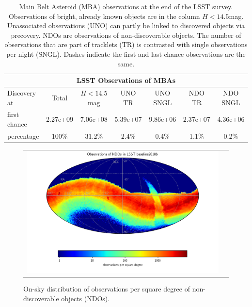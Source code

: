 \begin{table}[tb!]
\begin{center}
\begin{tabular}{lcccccc}
\multicolumn{7}{c}{LSST Observations of MBAs}\\
\hline
Discovery at & Total & $H<14.5$mag & UNO TR & UNO SNGL & NDO TR & NDO SNGL \\
\hline
first chance & 2.27e+09 & 7.06e+08 & 5.39e+07 & 9.86e+06 & 2.37e+07 & 4.36e+06 \\
percentage   & 100\%  & 31.2\% & 2.4\% & 0.4\% & 1.1\% & 0.2\% \\\hline
\hline
\end{tabular}
\end{center}
\caption{Main Belt Asteroid (MBA) observations at the end of the LSST survey. Observations of bright, already known objects are in the column $H<14.5$mag.
Unassociated observations (UNO) can partly be linked to discovered objects via precovery. NDOs are observations of non-discoverable objects. The number of observations that are part of tracklets (TR) is contrasted with single observations per night (SNGL). Dashes indicate the first and last chance observations are the same.\label{tab:mbaobs}}
\end{table}

\begin{figure}[tb!]
\begin{center}
\begin{tabular}{cc}
\includegraphics[width=0.80\linewidth]{figs/mba_obs_hp_ndo.png} &
\end{tabular}
\end{center}
\caption{On-sky distribution of observations per square degree of non-discoverable objects (NDOs).  }
\label{fig:ndo_obs_sky}       %
\end{figure}


